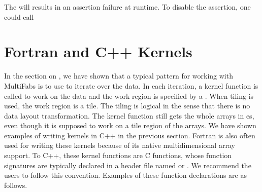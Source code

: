 \documentclass[letterpaper,10pt,english]{sphinxmanual}
\begin{document}
\begin{sphinxVerbatim}[commandchars=\\\{\}]
 
 
\end{sphinxVerbatim}

\sphinxAtStartPar
The will results in an assertion failure at runtime.  To disable the
assertion, one could call

\begin{sphinxVerbatim}[commandchars=\\\{\}]
   
\end{sphinxVerbatim}

\begin{sphinxVerbatim}[commandchars=\\\{\}]
  
  
\end{sphinxVerbatim}


\section{Fortran and C++ Kernels}
\label{\detokenize{Basics:fortran-and-c-kernels}}\label{\detokenize{Basics:sec-basics-fortran}}
\sphinxAtStartPar
In the section on {\hyperref[\detokenize{Basics:sec-basics-mfiter}]{}}, we have shown that a typical
pattern for working with MultiFabs is to use  to iterate over the
data. In each iteration, a kernel function is called to work on the data and
the work region is specified by a .  When tiling is used, the work
region is a tile. The tiling is logical in the sense that there is no data
layout transformation. The kernel function still gets the whole arrays in
es, even though it is supposed to work on a tile region of the
arrays.  We have shown examples of writing kernels in C++ in the
previous section.  Fortran is also often used for writing these kernels because of its
native multi\sphinxhyphen{}dimensional array support.  To C++, these kernel functions are
C functions, whose function signatures are typically declared in a header file
named  or . We recommend the users to follow this convention.
Examples of these function declarations are as follows.
\end{document}
